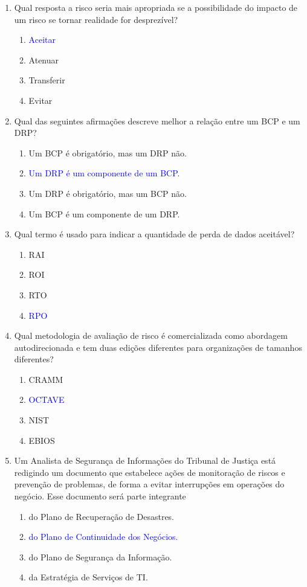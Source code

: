 \documentclass{report}
\begin{document}
\begin{enumerate}
		\item Qual resposta a risco seria mais apropriada se a possibilidade do impacto de um risco se tornar realidade for desprezível?
		\begin{enumerate}[label=(\alph*)]
			\item \textcolor{blue}{Aceitar}
			\item Atenuar
			\item Transferir
			\item Evitar
		\end{enumerate}
		
		\item Qual das seguintes afirmações descreve melhor a relação entre um BCP e um DRP?
		\begin{enumerate}[label=(\alph*)]
			\item Um BCP é obrigatório, mas um DRP não.
			\item \textcolor{blue}{Um DRP é um componente de um BCP.}
			\item Um DRP é obrigatório, mas um BCP não.
			\item Um BCP é um componente de um DRP.
		\end{enumerate}
		
		\item Qual termo é usado para indicar a quantidade de perda de dados aceitável?
		\begin{enumerate}[label=(\alph*)]
			\item RAI
			\item ROI
			\item RTO
			\item \textcolor{blue}{RPO}
		\end{enumerate}
		
		\item Qual metodologia de avaliação de risco é comercializada como abordagem autodirecionada e tem duas edições diferentes para organizações de tamanhos diferentes?
		\begin{enumerate}[label=(\alph*)]
			\item CRAMM
			\item \textcolor{blue}{OCTAVE}
			\item NIST
			\item EBIOS
		\end{enumerate}
		
		\item Um Analista de Segurança de Informações do Tribunal de Justiça está redigindo um documento que estabelece ações de monitoração de riscos e prevenção de problemas, de forma a evitar interrupções em operações do negócio. Esse documento será parte integrante
		\begin{enumerate}[label=(\alph*)]
			\item do Plano de Recuperação de Desastres.
			\item \textcolor{blue}{do Plano de Continuidade dos Negócios.}
			\item do Plano de Segurança da Informação.
			\item da Estratégia de Serviços de TI.
		\end{enumerate}
		

\end{enumerate}
\end{document}
